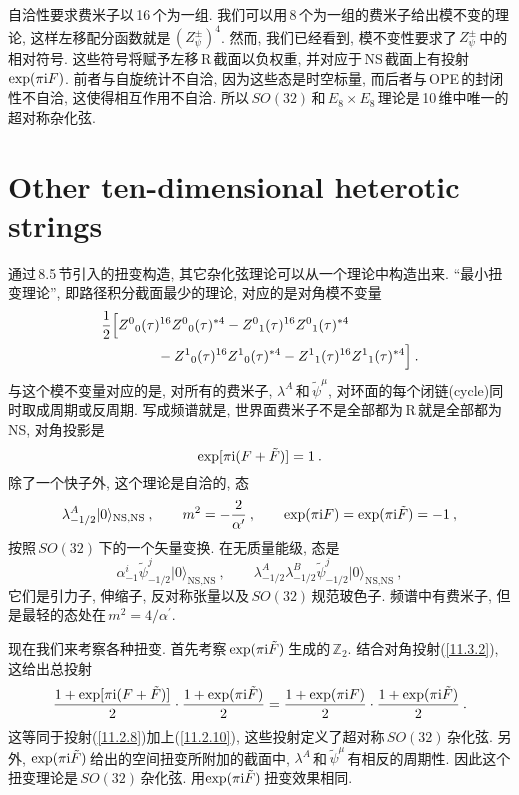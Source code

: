 自洽性要求费米子以\,16\,个为一组. 我们可以用\,8\,个为一组的费米子给出模不变的理论, 这样左移配分函数就是$\,(Z_{\psi}^{\pm})^{4}$. 然而, 我们已经看到, 模不变性要求了$\,Z_{\psi}^{\pm}\,$中的相对符号. 这些符号将赋予左移\,R\,截面以负权重, 并对应于\,NS\,截面上有投射\,$\exp(\pi\mathrm{i} F)$. 前者与自旋统计不自洽, 因为这些态是时空标量, 而后者与\,OPE\,的封闭性不自洽, 这使得相互作用不自洽. 所以\,$SO(32)\,$和$\,E_{8}\times E_{8}\,$理论是\,10\,维中唯一的超对称杂化弦. 

\section{Other ten-dimensional heterotic strings}

通过\,8.5\,节引入的扭变构造, 其它杂化弦理论可以从一个理论中构造出来. ``最小扭变理论'', 即路径积分截面最少的理论, 对应的是对角模不变量
\begin{align}
    &\frac{1}{2}\Bigl[
    Z^{0}{}_{0}(\tau)^{16}Z^{0}{}_{0}(\tau)^{\ast 4}- Z^{0}{}_{1}(\tau)^{16}Z^{0}{}_{1}(\tau)^{\ast 4} \nonumber \\
    &\qquad \qquad - Z^{1}{}_{0}(\tau)^{16}Z^{1}{}_{0}(\tau)^{\ast 4}-Z^{1}{}_{1}(\tau)^{16}Z^{1}{}_{1}(\tau)^{\ast 4}
    \Bigr]  \:. \label{11.3.1}
\end{align}
与这个模不变量对应的是, 对所有的费米子, $\lambda^{A}\,$和$\,\tilde{\psi}^{\mu}$, 对环面的每个闭链(cycle)同时取成周期或反周期. 写成频谱就是, 世界面费米子不是全部都为\,R\,就是全部都为\,NS, 对角投影是
\begin{equation}
    \exp[\pi\mathrm{i}(F+\tilde{F})] =1 \:. \label{11.3.2}
\end{equation}
除了一个快子外, 这个理论是自洽的, 态
\begin{equation}
    \lambda_{-1/2}^{A}\lvert 0\rangle_{\text{NS,NS}}\:, \qquad m^{2}=-\frac{2}{\alpha^{\prime}}\:,\qquad
    \exp(\pi\mathrm{i} F)=\exp(\pi\mathrm{i}\tilde{F})=-1\:,  \label{11.3.3}
\end{equation}
按照$\,SO(32)\,$下的一个矢量变换. 在无质量能级, 态是
\begin{equation}
    \alpha^{i}_{-1}\tilde{\psi}^{j}_{-1/2} \lvert0\rangle_{\text{NS,NS}} \:, \qquad
    \lambda^{A}_{-1/2}\lambda_{-1/2}^{B}\tilde{\psi}^{j}_{-1/2}\lvert 0\rangle_{\text{NS,NS}} \:, \label{11.3.4}
\end{equation}
它们是引力子, 伸缩子, 反对称张量以及$\,SO(32)\,$规范玻色子. 频谱中有费米子, 但是最轻的态处在$\,m^{2}=4/\alpha^{\prime}$.

现在我们来考察各种扭变. 首先考察$\,\exp(\pi\mathrm{i} \tilde{F})\,$生成的$\,\mathds{Z}_{2}$. 结合对角投射(\ref{11.3.2}), 这给出总投射
\begin{equation}
    \frac{1+\exp[\pi\mathrm{i}(F+\tilde{F})]}{2}\cdot \frac{1+\exp(\pi\mathrm{i}\tilde{F})}{2}
    = \frac{1+\exp(\pi\mathrm{i} F)}{2}\cdot \frac{1+\exp(\pi\mathrm{i}\tilde{F})}{2} \:. \label{11.3.5}
\end{equation}
这等同于投射(\ref{11.2.8})加上(\ref{11.2.10}), 这些投射定义了超对称$\,SO(32)\,$杂化弦. 另外, $\exp(\pi\mathrm{i}\tilde{F})\,$给出的空间扭变所附加的截面中, $\lambda^{A}\,$和$\,\tilde{\psi}^{\mu}\,$有相反的周期性. 因此这个扭变理论是$\,SO(32)\,$杂化弦. 用$\exp(\pi\mathrm{i}\tilde{F})\,$扭变效果相同.

